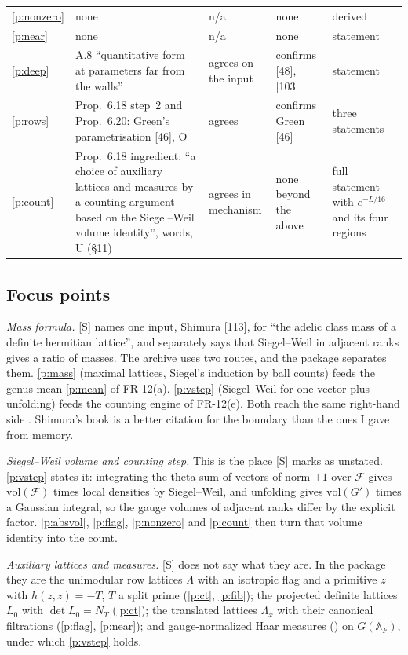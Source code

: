 \documentclass[11pt]{article}
\newcommand{\FR}[1]{\textsf{FR-#1}}
\newcommand{\vol}{\mathrm{vol}}
\theoremstyle{remark}
\begin{document}
\begin{longtable}{p{}p{}p{}p{}p{}}
\ref{p:nonzero} & none & n/a & none & derived\\
\ref{p:near} & none & n/a & none & statement\\
\ref{p:deep} & A.8 ``quantitative form at parameters far from the walls'' & agrees on the input & confirms [48], [103] & statement\\
\ref{p:rows} & Prop.~6.18 step~2 and Prop.~6.20: Green's parametrisation [46], O & agrees & confirms Green [46] & three statements\\
\ref{p:count} & Prop.~6.18 ingredient: ``a choice of auxiliary lattices and measures by a counting argument based on the Siegel--Weil volume identity'', words, U (\S11) & agrees in mechanism & none beyond the above & full statement with $e^{-L/16}$ and its four regions\\
\bottomrule
\end{longtable}

\subsection*{Focus points}

\emph{Mass formula.} [S] names one input, Shimura [113], for ``the adelic class mass of a definite hermitian lattice'', and separately says that Siegel--Weil in adjacent ranks gives a ratio of masses. The archive uses two routes, and the package separates them. \ref{p:mass} (maximal lattices, Siegel's induction by ball counts) feeds the genus mean \ref{p:mean} of \FR{12}(a). \ref{p:vstep} (Siegel--Weil for one vector plus unfolding) feeds the counting engine of \FR{12}(e). Both reach the same right-hand side . Shimura's book is a better citation for the boundary than the ones I gave from memory.

\emph{Siegel--Weil volume and counting step.} This is the place [S] marks as unstated. \ref{p:vstep} states it: integrating the theta sum of vectors of norm $\pm1$ over $\mathcal F$ gives $\vol(\mathcal F)$ times local densities by Siegel--Weil, and unfolding gives $\vol(G')$ times a Gaussian integral, so the gauge volumes of adjacent ranks differ by the explicit factor. \ref{p:absvol}, \ref{p:flag}, \ref{p:nonzero} and \ref{p:count} then turn that volume identity into the count.

\emph{Auxiliary lattices and measures.} [S] does not say what they are. In the package they are the unimodular row lattices $\Lambda$ with an isotropic flag and a primitive $z$ with $h(z,z)=-T$, $T$ a split prime (\ref{p:ct}, \ref{p:fib}); the projected definite lattices $L_0$ with $\det L_0=N_T$ (\ref{p:ct}); the translated lattices $\Lambda_x$ with their canonical filtrations (\ref{p:flag}, \ref{p:near}); and gauge-normalized Haar measures () on $G(\mathbb A_F)$, under which \ref{p:vstep} holds.
\end{document}
